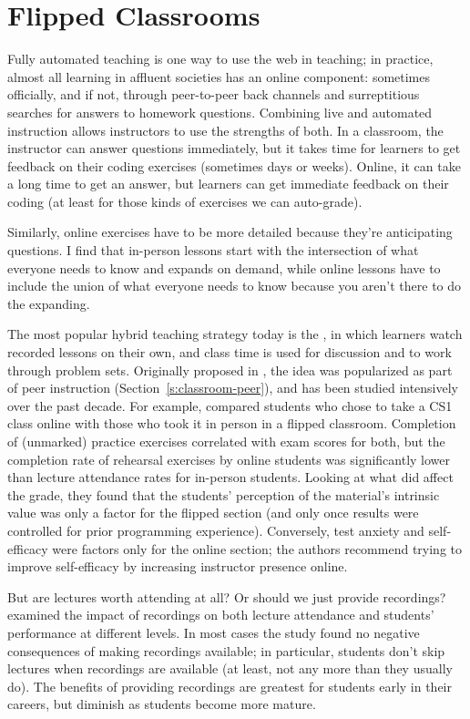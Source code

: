 \section{Flipped Classrooms}\label{s:online-flipped}

Fully automated teaching is one way to use the web in teaching; in
practice, almost all learning in affluent societies has an online
component: sometimes officially, and if not, through peer-to-peer back
channels and surreptitious searches for answers to homework questions.
Combining live and automated instruction allows instructors to use the
strengths of both. In a classroom, the instructor can answer questions
immediately, but it takes time for learners to get feedback on their
coding exercises (sometimes days or weeks). Online, it can take a long
time to get an answer, but learners can get immediate feedback on their
coding (at least for those kinds of exercises we can auto-grade).

Similarly, online exercises have to be more detailed because they're
anticipating questions. I find that in-person lessons start with the
intersection of what everyone needs to know and expands on demand, while
online lessons have to include the union of what everyone needs to know
because you aren't there to do the expanding.

The most popular hybrid teaching strategy today is the
, in which learners
watch recorded lessons on their own, and class time is used for
discussion and to work through problem sets. Originally proposed in
\cite{King1993}, the idea was popularized as part of peer instruction
(Section~\ref{s:classroom-peer}), and has been studied intensively over
the past decade. For example, \cite{Camp2016} compared students who
chose to take a CS1 class online with those who took it in person in a
flipped classroom. Completion of (unmarked) practice exercises
correlated with exam scores for both, but the completion rate of
rehearsal exercises by online students was significantly lower than
lecture attendance rates for in-person students. Looking at what did
affect the grade, they found that the students' perception of the
material's intrinsic value was only a factor for the flipped section
(and only once results were controlled for prior programming
experience). Conversely, test anxiety and self-efficacy were factors
only for the online section; the authors recommend trying to improve
self-efficacy by increasing instructor presence online.

But are lectures worth attending at all? Or should we just provide
recordings? \cite{Nord2017} examined the impact of recordings on both
lecture attendance and students' performance at different levels. In
most cases the study found no negative consequences of making recordings
available; in particular, students don't skip lectures when recordings
are available (at least, not any more than they usually do). The
benefits of providing recordings are greatest for students early in
their careers, but diminish as students become more mature.

